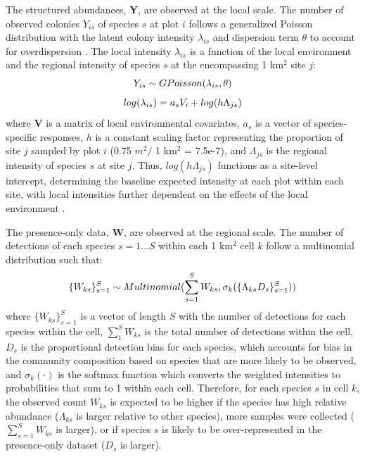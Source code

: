 \documentclass[preprint,review,times,12pt]{elsarticle}
\begin{document}
The structured abundances, \textbf{Y}, are observed at the local scale. The number of observed colonies $Y_{is}$ of species $s$ at plot $i$ follows a generalized Poisson distribution with the latent colony intensity $\lambda_{is}$ and dispersion term $\theta$ to account for overdispersion \citep{Consul1992,Ntzoufras2005}. The local intensity $\lambda_{is}$ is a function of the local environment and the regional intensity of species $s$ at the encompassing 1 km$^2$ site $j$:
    \begin{equation}
        Y_{is} \sim GPoisson(\lambda_{is}, \theta) \\
        \label{eq:Y_GP}
    \end{equation}
    \begin{equation}
        log(\lambda_{is}) = a_s V_i + log(h\Lambda_{js}) \\
        \label{eq:lambda}
    \end{equation}
where \textbf{V} is a matrix of local environmental covariates, $a_s$ is a vector of species-specific responses, $h$ is a constant scaling factor representing the proportion of site $j$ sampled by plot $i$ (0.75 $m^2 /$ 1 km$^2$ = 7.5e-7), and $\Lambda_{js}$ is the regional intensity of species $s$ at site $j$. Thus, $log(h\Lambda_{js})$ functions as a site-level intercept, determining the baseline expected intensity at each plot within each site, with local intensities further dependent on the effects of the local environment \citep{Yamaura2016}.

The presence-only data, \textbf{W}, are observed at the regional scale. The number of detections of each species $s=1 \dots S$ within each 1 km$^2$ cell $k$ follow a multinomial distribution such that:
    \begin{equation}
        \{W_{ks}\}_{s=1}^{S} \sim Multinomial(\sum_{s=1}^{S} W_{ks} , \sigma_k(\{\Lambda_{ks}D_s\}_{s=1}^{S})) \\
        \label{eq:W_Mn}
    \end{equation}
where $\{W_{ks}\}_{s=1}^{S}$ is a vector of length $S$ with the number of detections for each species within the cell, $\sum_{1}^{S} W_{ks}$ is the total number of detections within the cell, $D_s$ is the proportional detection bias for each species, which accounts for bias in the community composition based on species that are more likely to be observed, and $\sigma_k(\cdot)$ is the softmax function which converts the weighted intensities to probabilities that sum to 1 within each cell. Therefore, for each species $s$ in cell $k$, the observed count $W_{ks}$ is expected to be higher if the species has high relative abundance ($\Lambda_{ks}$ is larger relative to other species), more samples were collected ($\sum_{s=1}^{S} W_{ks}$ is larger), or if species $s$ is likely to be over-represented in the presence-only dataset ($D_s$ is larger). 
\end{document}
